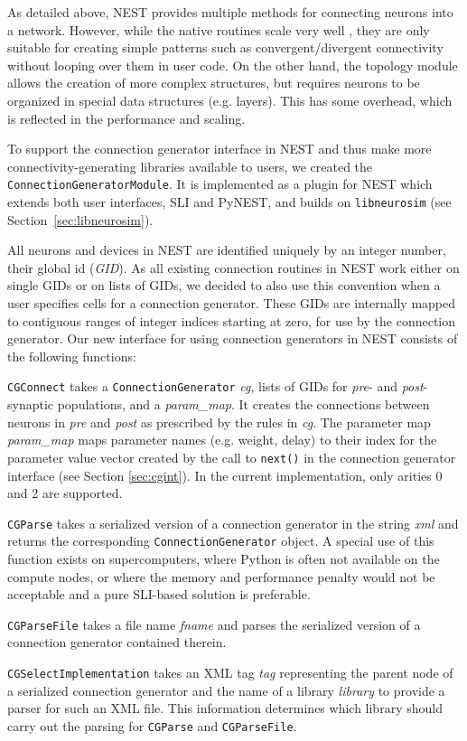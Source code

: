 \documentclass{frontiersSCNS} %
\begin{document}
As detailed above, NEST provides multiple methods for connecting
neurons into a network. However, while the native routines scale very
well \citep{Helias12_26}, they are only suitable for creating simple
patterns such as convergent/divergent connectivity without looping
over them in user code. On the other hand, the topology module
\citep{Plesser_13} allows the creation of more complex structures, but
requires neurons to be organized in special data structures (e.g.
layers). This has some overhead, which is reflected in the
performance and scaling.

To support the connection generator interface in NEST and thus make
more connectivity-generating libraries available to users, we created
the \verb|ConnectionGeneratorModule|. It is implemented as a plugin
for NEST which extends both user interfaces, SLI and PyNEST, and
builds on \verb|libneurosim| (see Section~\ref{sec:libneurosim}).

All neurons and devices in NEST are identified uniquely by an integer
number, their global id (\emph{GID}). As all existing connection
routines in NEST work either on single GIDs or on lists of GIDs, we
decided to also use this convention when a user specifies cells for a
connection generator. These GIDs are internally mapped to contiguous
ranges of integer indices starting at zero, for use by the connection
generator.  Our new interface for using connection generators in NEST
consists of the following functions:

\begin{unlist}
\item[{\tt CGConnect} ] takes a \verb|ConnectionGenerator| \emph{cg},
  lists of GIDs for \emph{pre}- and \emph{post}-synaptic populations,
  and a \emph{param\_map}. It creates the connections between neurons
  in \emph{pre} and \emph{post} as prescribed by the rules in
  \emph{cg}. The parameter map \emph{param\_map} maps parameter names
  (e.g. weight, delay) to their index for the parameter value vector
  created by the call to \verb|next()| in the connection generator
  interface (see Section \ref{sec:cgint}). In the current
  implementation, only arities 0 and 2 are supported.
\item[{\tt CGParse} ] takes a serialized version of a connection
  generator in the string \emph{xml} and returns the corresponding
  \verb|ConnectionGenerator| object. A special use of this function
  exists on supercomputers, where Python is often not available on the
  compute nodes, or where the memory and performance penalty would not
  be acceptable and a pure SLI-based solution is preferable.
\item[{\tt CGParseFile} ] takes a file name \emph{fname} and parses the
  serialized version of a connection generator contained therein.
\item[{\tt CGSelectImplementation} ] takes an XML tag \emph{tag}
  representing the parent node of a serialized connection generator
  and the name of a library \emph{library} to provide a parser for
  such an XML file. This information determines which library should
  carry out the parsing for \verb|CGParse| and \verb|CGParseFile|.
\end{unlist}
\end{document}
